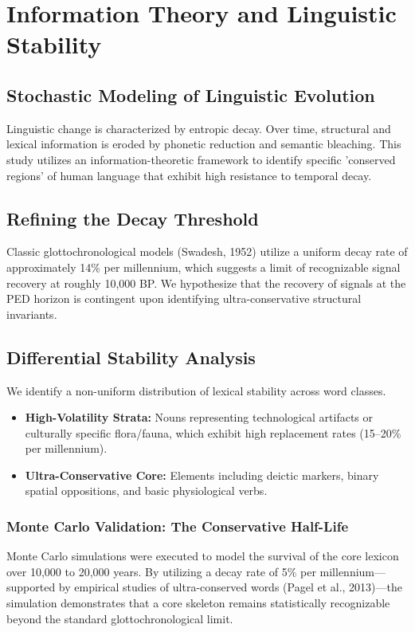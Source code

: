 \chapter{Information Theory and Linguistic Stability}

\section{Stochastic Modeling of Linguistic Evolution}
Linguistic change is characterized by entropic decay. Over time, structural and lexical information is eroded by phonetic reduction and semantic bleaching. This study utilizes an information-theoretic framework to identify specific 'conserved regions' of human language that exhibit high resistance to temporal decay.

\section{Refining the Decay Threshold}
Classic glottochronological models (Swadesh, 1952) utilize a uniform decay rate of approximately 14\% per millennium, which suggests a limit of recognizable signal recovery at roughly 10,000 BP. We hypothesize that the recovery of signals at the PED horizon is contingent upon identifying ultra-conservative structural invariants.

\section{Differential Stability Analysis}
We identify a non-uniform distribution of lexical stability across word classes. 
\begin{itemize}
    \item \textbf{High-Volatility Strata:} Nouns representing technological artifacts or culturally specific flora/fauna, which exhibit high replacement rates (15–20\% per millennium).
    \item \textbf{Ultra-Conservative Core:} Elements including deictic markers, binary spatial oppositions, and basic physiological verbs. 
\end{itemize}

\subsection{Monte Carlo Validation: The Conservative Half-Life}
Monte Carlo simulations were executed to model the survival of the core lexicon over 10,000 to 20,000 years. By utilizing a decay rate of 5\% per millennium—supported by empirical studies of ultra-conserved words (Pagel et al., 2013)—the simulation demonstrates that a core skeleton remains statistically recognizable beyond the standard glottochronological limit.

